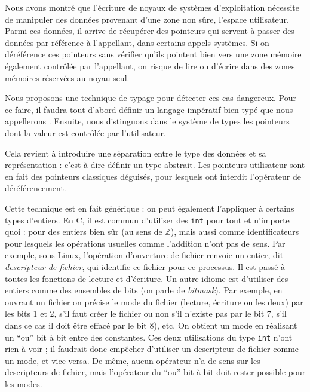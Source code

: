 
Nous avons montré que l'écriture de noyaux de systèmes d'exploitation nécessite
de manipuler des données provenant d'une zone non sûre, l'espace utilisateur.
Parmi ces données, il arrive de récupérer des pointeurs qui servent à passer des
données par référence à l'appellant, dans certains appels systèmes. Si on
déréférence ces pointeurs sans vérifier qu'ils pointent bien vers une zone
mémoire également contrôlée par l'appellant, on risque de lire ou d'écrire dans
des zones mémoires réservées au noyau seul.

Nous proposons une technique de typage pour détecter ces cas dangereux. Pour ce
faire, il faudra tout d'abord définir un langage impératif bien typé que nous
appellerons \langname. Ensuite, nous distinguons dans le système de types les
pointeurs dont la valeur est contrôlée par l'utilisateur.

Cela revient à introduire une séparation entre le type des données et sa
représentation : c'est-à-dire définir un type abstrait. Les pointeurs
utilisateur sont en fait des pointeurs classiques déguisés, pour lesquels ont
interdit l'opérateur de déréférencement.

Cette technique est en fait générique : on peut également l'appliquer à certains
types d'entiers. En C, il est commun d'utiliser des \texttt{int} pour tout et
n'importe quoi : pour des entiers bien sûr (au sens de $ℤ$), mais aussi comme
identificateurs pour lesquels les opérations usuelles comme l'addition n'ont pas
de sens. Par exemple, sous Linux, l'opération d'ouverture de fichier renvoie un
entier, dit \emph{descripteur de fichier}, qui identifie ce fichier pour ce
processus. Il est passé à toutes les fonctions de lecture et d'écriture. Un
autre idiome est d'utiliser des entiers comme des ensembles de bits (on parle de
\emph{bitmask}). Par exemple, en ouvrant un fichier on précise le mode du
fichier (lecture, écriture ou les deux) par les bits 1 et 2, s'il faut créer le
fichier ou non s'il n'existe pas par le bit 7, s'il dans ce cas il doit être
effacé par le bit 8), etc. On obtient un mode en réalisant un ``ou'' bit à bit
entre des constantes. Ces deux utilisations du type \texttt{int} n'ont rien à
voir ; il faudrait donc empêcher d'utiliser un descripteur de fichier comme un
mode, et vice-versa. De même, aucun opérateur n'a de sens sur les descripteurs
de fichier, mais l'opérateur \texttt{\textbar{}} du ``ou'' bit à bit doit rester
possible pour les modes.

